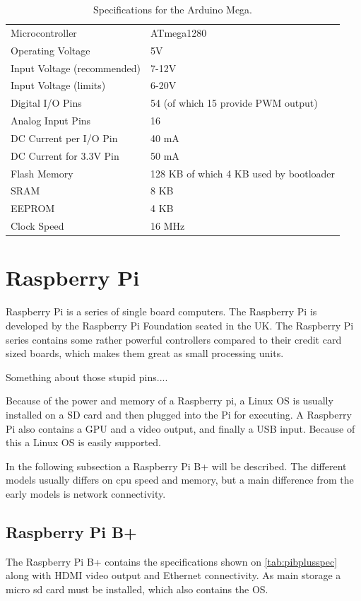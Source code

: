 \begin{table}[h!]
\begin{tabular}{| l | l |}
\hline
Microcontroller & ATmega1280\\
Operating Voltage & 5V\\
Input Voltage (recommended) & 7-12V\\
Input Voltage (limits) & 6-20V\\
Digital I/O Pins & 54 (of which 15 provide PWM output)\\
Analog Input Pins & 16\\
DC Current per I/O Pin & 40 mA\\
DC Current for 3.3V Pin & 50 mA\\
Flash Memory & 128 KB of which 4 KB used by bootloader\\
SRAM & 8 KB\\
EEPROM & 4 KB\\
Clock Speed & 16 MHz\\
\hline
\end{tabular}
\caption{Specifications for the Arduino Mega.}
\end{table}
\label{tab:megaspec}


\section{Raspberry Pi}
Raspberry Pi is a series of single board computers. The Raspberry Pi is developed by the Raspberry Pi Foundation seated in the UK. The Raspberry Pi series contains some rather powerful controllers compared to their credit card sized boards, which makes them great as small processing units.

Something about those stupid pins....

Because of the power and memory of a Raspberry pi, a Linux OS is usually installed on a SD card and then plugged into the Pi for executing. A Raspberry Pi also contains a GPU and a video output, and finally a USB input. Because of this a Linux OS is easily supported.

In the following subsection a Raspberry Pi B+ will be described. The different models usually differs on cpu speed and memory, but a main difference from the early models is network connectivity.

\subsection{Raspberry Pi B+}
The Raspberry Pi B+ contains the specifications shown on \ref{tab:pibplusspec} along with HDMI video output and Ethernet connectivity. As main storage a micro sd card must be installed, which also contains the OS.


